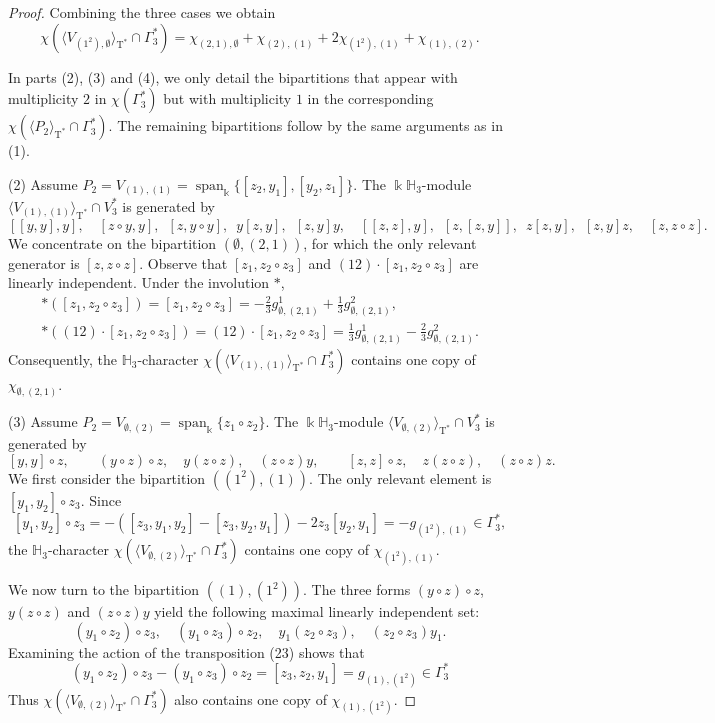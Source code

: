 \documentclass[10pt,a4paper]{amsart}
\def \Ga{\Gamma}
\def \H{\mathbb{H}}
\def \T{\operatorname{T}}
\def \es{\emptyset}
\def \k{\Bbbk}
\newcommand{\lr}[1]{\langle #1 \rangle}
\def \sp{\operatorname{span}}
\begin{document}
\begin{proof}
	Combining the three cases we obtain
	\[
	\chi({\lr{V_{(1^2), \es}}_{\T^*} \cap \Ga_3^*}) = \chi_{(2,1),\es} +\chi_{(2),(1)} + 2\chi_{(1^2),(1)} + \chi_{(1),(2)}.
	\] 
	
	In parts (2), (3) and (4), we only detail the bipartitions that appear with multiplicity $2$ in $\chi(\Ga_3^*)$ but with multiplicity $1$ in the corresponding $\chi(\langle P_2\rangle_{\T^*} \cap \Ga_3^*)$. The remaining bipartitions follow by the same arguments as in (1).
	
	(2) Assume $P_2 = V_{(1), (1)} = \sp_\k \{[z_2,y_1], [y_2,z_1] \}$. The $\k\H_3$-module $\lr{V_{(1),(1)}}_{\T^*} \cap V_3^*$ is generated by
	\[
	[[y,y],y],\enspace\enspace [z\circ y,y],\enspace [z,y\circ y],\enspace y[z,y],\enspace [z,y]y,\enspace\enspace [[z,z],y],\enspace [z,[z,y]],\enspace  z[z,y],\enspace  [z,y]z,\enspace\enspace [z,z\circ z].
	\] 
	We concentrate on the bipartition $(\es, (2,1))$, for which the only relevant generator is $[z,z\circ z]$. Observe that $[z_1,z_2\circ z_3]$ and $(12)\cdot [z_1,z_2\circ z_3]$ are linearly independent. Under the involution $*$,
	\begin{align*}
	*([z_1,z_2\circ z_3])=[z_1,z_2\circ z_3]=-\frac{2}{3}g_{\es,(2,1)}^1+\frac{1}{3}g_{\es,(2,1)}^2,\\
	*((12)\cdot [z_1,z_2\circ z_3])=(12)\cdot [z_1,z_2\circ z_3]=\frac{1}{3}g_{\es,(2,1)}^1-\frac{2}{3}g_{\es,(2,1)}^2.
	\end{align*}
	Consequently, the $\H_3$-character $\chi(\lr{V_{(1),(1)}}_{\T^*} \cap \Ga_3^*)$ contains one copy of $\chi_{\es,(2,1)}$.
	
	(3) Assume $P_2 = V_{\es, (2)} = \sp_\k \{z_1 \circ z_2 \}$. The $\k\H_3$-module $\lr{V_{\es, (2)}}_{\T^*} \cap V_3^*$ is generated by 
	\[
	[y,y]\circ z,\qquad (y\circ z)\circ z,\quad y(z\circ z),\quad (z\circ z)y,\qquad [z,z]\circ z,\quad z(z\circ z),\quad (z\circ z)z.
	\] 
	We first consider the bipartition $((1^2), (1))$. The only relevant element is $[y_1,y_2] \circ z_3$. Since
	\[
	[y_1,y_2]\circ z_3=-([z_3,y_1,y_2]-[z_3,y_2,y_1])-2z_3[y_2,y_1]= -g_{(1^2),(1)} \in \Ga_3^*,
	\]
	the $\H_3$-character $\chi(\lr{V_{\es, (2)}}_{\T^*} \cap \Ga_3^*)$ contains one copy of $\chi_{(1^2),(1)}$.
	
	We now turn to the bipartition $((1), (1^2))$. The three forms $(y\circ z)\circ z$, $y(z\circ z)$ and $(z\circ z)y$ yield the following maximal linearly independent set:
	\[
	(y_1\circ z_2)\circ z_3, \quad (y_1\circ z_3)\circ z_2, \quad y_1(z_2\circ z_3), \quad (z_2\circ z_3)y_1.
	\]
	Examining the action of the transposition (23) shows that
	\[
	(y_1\circ z_2)\circ z_3-(y_1\circ z_3)\circ z_2=[z_3,z_2,y_1] = g_{(1),(1^2)} \in \Ga_3^*
	\]
	Thus $\chi(\lr{V_{\es, (2)}}_{\T^*} \cap \Ga_3^*)$ also  contains one copy of $\chi_{(1),(1^2)}$.
	

\end{proof}
\end{document}
